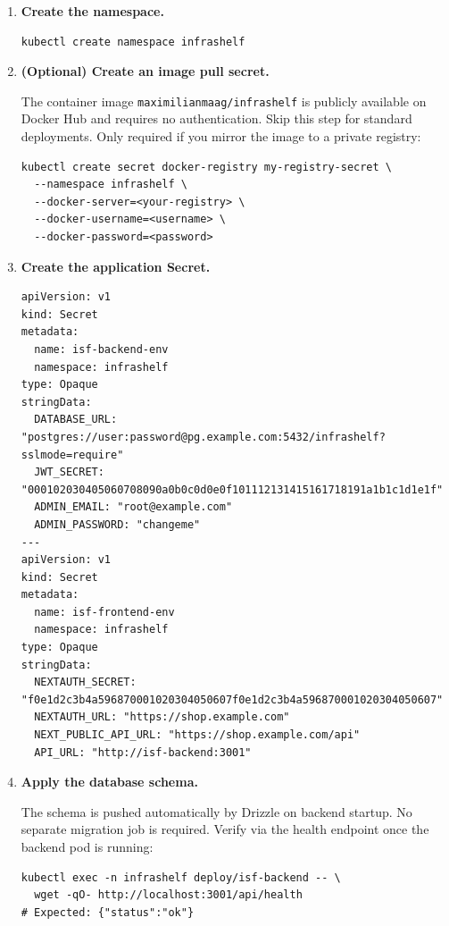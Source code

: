 \documentclass[12pt,a4paper,twoside]{report}
\newcommand{\code}[1]{\texttt{#1}}
\begin{document}
\begin{enumerate}

\item \textbf{Create the namespace.}
\begin{lstlisting}[style=bash]
kubectl create namespace infrashelf
\end{lstlisting}

\item \textbf{(Optional) Create an image pull secret.}

The container image \code{maximilianmaag/infrashelf} is publicly
available on Docker Hub and requires no authentication. Skip this step
for standard deployments. Only required if you mirror the image to a
private registry:
\begin{lstlisting}[style=bash]
kubectl create secret docker-registry my-registry-secret \
  --namespace infrashelf \
  --docker-server=<your-registry> \
  --docker-username=<username> \
  --docker-password=<password>
\end{lstlisting}

\item \textbf{Create the application Secret.}
\begin{lstlisting}[style=yaml,caption={Kubernetes Secrets for backend and frontend},label={lst:k8s-secret}]
apiVersion: v1
kind: Secret
metadata:
  name: isf-backend-env
  namespace: infrashelf
type: Opaque
stringData:
  DATABASE_URL: "postgres://user:password@pg.example.com:5432/infrashelf?sslmode=require"
  JWT_SECRET: "000102030405060708090a0b0c0d0e0f101112131415161718191a1b1c1d1e1f"
  ADMIN_EMAIL: "root@example.com"
  ADMIN_PASSWORD: "changeme"
---
apiVersion: v1
kind: Secret
metadata:
  name: isf-frontend-env
  namespace: infrashelf
type: Opaque
stringData:
  NEXTAUTH_SECRET: "f0e1d2c3b4a596870001020304050607f0e1d2c3b4a596870001020304050607"
  NEXTAUTH_URL: "https://shop.example.com"
  NEXT_PUBLIC_API_URL: "https://shop.example.com/api"
  API_URL: "http://isf-backend:3001"
\end{lstlisting}

\item \textbf{Apply the database schema.}

The schema is pushed automatically by Drizzle on backend startup. No
separate migration job is required. Verify via the health endpoint once
the backend pod is running:
\begin{lstlisting}[style=bash]
kubectl exec -n infrashelf deploy/isf-backend -- \
  wget -qO- http://localhost:3001/api/health
# Expected: {"status":"ok"}
\end{lstlisting}


\end{enumerate}
\end{document}
